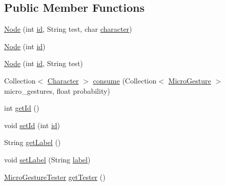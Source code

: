 \subsection*{Public Member Functions}
\begin{DoxyCompactItemize}
\item 
\hyperlink{classch_1_1zhaw_1_1ba10__bsha__1_1_1graph_1_1Node_ac83645efc3aceb760b465c38bd3d6083}{Node} (int \hyperlink{classch_1_1zhaw_1_1ba10__bsha__1_1_1graph_1_1Node_a6ac4c87055132ff5de2f303d64baf0ba}{id}, String test, char \hyperlink{classch_1_1zhaw_1_1ba10__bsha__1_1_1graph_1_1Node_ab6bd424b381dc0f19d9f49d0b2cb56fc}{character})
\item 
\hyperlink{classch_1_1zhaw_1_1ba10__bsha__1_1_1graph_1_1Node_afbca65b1cddca6b543f2227031529020}{Node} (int \hyperlink{classch_1_1zhaw_1_1ba10__bsha__1_1_1graph_1_1Node_a6ac4c87055132ff5de2f303d64baf0ba}{id})
\item 
\hyperlink{classch_1_1zhaw_1_1ba10__bsha__1_1_1graph_1_1Node_a7842c35883c45ad3b56fcdcfe830e738}{Node} (int \hyperlink{classch_1_1zhaw_1_1ba10__bsha__1_1_1graph_1_1Node_a6ac4c87055132ff5de2f303d64baf0ba}{id}, String test)
\item 
Collection$<$ \hyperlink{classch_1_1zhaw_1_1ba10__bsha__1_1_1Character}{Character} $>$ \hyperlink{classch_1_1zhaw_1_1ba10__bsha__1_1_1graph_1_1Node_a985b135e0ae7c0453985cd1dacdc4bc7}{consume} (Collection$<$ \hyperlink{classch_1_1zhaw_1_1ba10__bsha__1_1_1service_1_1MicroGesture}{MicroGesture} $>$ micro\_\-gestures, float probability)
\item 
int \hyperlink{classch_1_1zhaw_1_1ba10__bsha__1_1_1graph_1_1Node_a725596466df160f7aa65009dbd29e3d8}{getId} ()
\item 
void \hyperlink{classch_1_1zhaw_1_1ba10__bsha__1_1_1graph_1_1Node_a2d145e592a040c0c608caf33a59e0007}{setId} (int \hyperlink{classch_1_1zhaw_1_1ba10__bsha__1_1_1graph_1_1Node_a6ac4c87055132ff5de2f303d64baf0ba}{id})
\item 
String \hyperlink{classch_1_1zhaw_1_1ba10__bsha__1_1_1graph_1_1Node_a0175cf0a68d3cb8e43579638f4ccc264}{getLabel} ()
\item 
void \hyperlink{classch_1_1zhaw_1_1ba10__bsha__1_1_1graph_1_1Node_a1a6b348d6dba34a3f7b6ec9f742952f6}{setLabel} (String \hyperlink{classch_1_1zhaw_1_1ba10__bsha__1_1_1graph_1_1Node_a02527090afc270a47397d31fedb70375}{label})
\item 
\hyperlink{classch_1_1zhaw_1_1ba10__bsha__1_1_1service_1_1MicroGestureTester}{MicroGestureTester} \hyperlink{classch_1_1zhaw_1_1ba10__bsha__1_1_1graph_1_1Node_a25060c21d8718f9c9685ed20446e4611}{getTester} ()

\end{DoxyCompactItemize}
